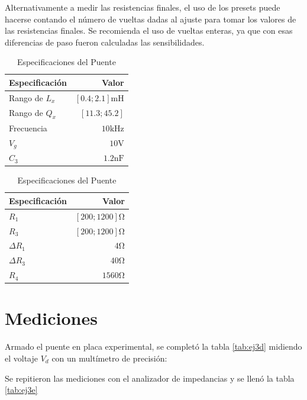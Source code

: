     Alternativamente a medir las resistencias finales, el uso de los presets puede hacerse
    contando el número de vueltas dadas al ajuste para tomar los valores de las resistencias
    finales. Se recomienda el uso de vueltas enteras, ya que con esas diferencias de paso
    fueron calculadas las sensibilidades.

    \begin{table}[h]
        \begin{center}
            \begin{tabular}{|l|r|}
                \hline
                Especificación & Valor \\
                \hline
                Rango de $L_x$ & $[0.4;2.1]\si{\milli\henry}$ \\
                Rango de $Q_x$ & $ [11.3; 45.2] $ \\
                Frecuencia & $10\si{\kilo\hertz}$\\
                $V_g$ & $10\si{\volt}$\\
                $C_3$ & $1.2\si{\nano\farad}$\\
                \hline
            \end{tabular}
            \begin{tabular}{|l|r|}
                \hline
                Especificación & Valor \\
                \hline
                $R_1$ & $[200;1200]\si{\ohm}$\\
                $R_3$ & $[200;1200]\si{\ohm}$\\
                $\Delta R_1$ & $4\si{\ohm}$ \\
                $\Delta R_3$ & $40\si{\ohm}$ \\
                $R_4$ & $1560\si{\ohm}$\\
                \hline
            \end{tabular}
            \caption{Especificaciones del Puente}
            \label{tab:ej3specFin}
        \end{center}
    \end{table}

    \section{Mediciones}
    Armado el puente en placa experimental, se completó la tabla \ref{tab:ej3d} midiendo el voltaje $V_d$
    con un multímetro de precisión:
    

    Se repitieron las mediciones con el analizador de impedancias y se llenó la tabla \ref{tab:ej3e}
    

